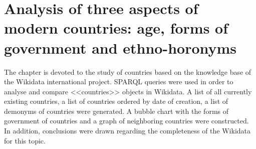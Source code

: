 \setchapterpreamble[u]{\margintoc}
\chapter{Analysis of three aspects of modern countries: age, forms of government and ethno-horonyms}


The chapter is devoted to the study of countries based on the knowledge base of the Wikidata international project. SPARQL queries were used in order to analyse and compare <<countries>> objects in Wikidata. A list of all currently existing countries, a list of countries ordered by date of creation, a list of demonyms of countries were generated. A bubble chart with the forms of government of countries and a graph of neighboring countries were constructed. In addition, conclusions were drawn regarding the completeness of the Wikidata for this topic.
